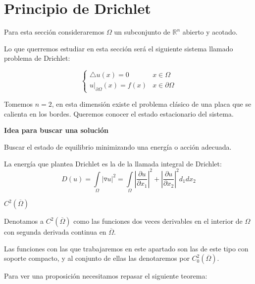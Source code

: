 \documentclass[openany]{book}
\begin{document}
\section{Principio de Drichlet}

\noindent Para esta sección consideraremos $ \Omega $ un subconjunto de $ \mathbb{R}^{n} $ abierto y acotado.

Lo que querremos estudiar en esta sección será el siguiente sistema llamado problema de Drichlet:

$$ \left\{
\begin{array}{ll}
    \triangle u(x) = 0 & x \in \Omega\\
    u|_{\partial \Omega}(x) = f(x) & x \in \partial \Omega 
\end{array}
\right. $$

\begin{example}
    Tomemos $ n = 2 $, en esta dimensión existe el problema clásico de una placa que se calienta en los bordes. Queremos conocer el estado estacionario del sistema.
\end{example}

\begin{flushright}
    \textbf{Idea para buscar una solución}
\end{flushright}

Buscar el estado de equilibrio minimizando una energía o acción adecuada.

La energía que plantea Drichlet es la de la llamada integral de Drichlet:
$$ D(u) = \int\limits_{\Omega}^{}|\triangledown u | ^2 = \int\limits_{\Omega}^{} | \dfrac{\partial u}{\partial x_1}|^2 + | \dfrac{\partial u}{\partial x_2}|^2 d_1dx_2 $$

\begin{definition}
    $ C^2(\overline{\Omega}) $

    Denotamos a $ C^2(\overline{\Omega}) $ como las funciones dos veces derivables en el interior de $ \Omega $ con segunda derivada continua en $ \overline{\Omega} $.

    Las funciones con las que trabajaremos en este apartado son las de este tipo con soporte compacto, y al conjunto de ellas las denotaremos por $ C_0^2(\overline{\Omega }) $.
\end{definition}

Para ver una proposición necesitamos repasar el siguiente teorema:

\end{document}
